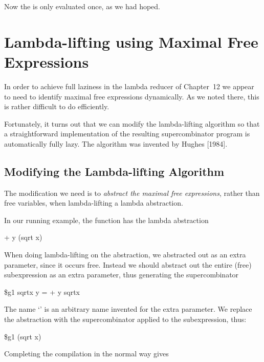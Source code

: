 \noindent
Now the  is only evaluated once, as we had hoped.

\section{Lambda-lifting using Maximal Free Expressions}

In order to achieve full laziness in the lambda reducer of Chapter~12 we
appear to need to identify maximal free expressions dynamically. As we noted
there, this is rather difficult to do efficiently.

Fortunately, it turns out that we can modify the lambda-lifting algorithm so
that a straightforward implementation of the resulting supercombinator
program is automatically fully lazy. The algorithm was invented by Hughes
[1984].

\subsection{Modifying the Lambda-lifting Algorithm}

The modification we need is to \textit{abstract the maximal free expressions}, rather
than free variables, when lambda-lifting a lambda abstraction.

In our running example, the function  has the lambda abstraction
\begin{mlcoded}
    + y (sqrt x)
\end{mlcoded}
When doing lambda-lifting on the  abstraction, we abstracted  out as an
extra parameter, since it occurs free. Instead we should abstract out the entire
(free) subexpression  as an extra parameter, thus generating the
supercombinator
\begin{mlcoded}
    \$g1 sqrtx y = + y sqrtx
\end{mlcoded}
The name `' is an arbitrary name invented for the extra parameter. We
replace the  abstraction with the supercombinator  applied to the
subexpression, thus:
\begin{mlcoded}
    \$g1 (sqrt x)
\end{mlcoded}
Completing the compilation in the normal way gives


